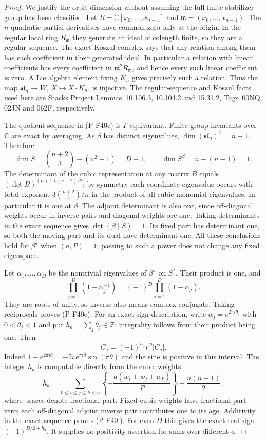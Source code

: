 \begin{proof}
We justify the orbit dimension without assuming the full
finite stabilizer group has been classified. Let
$R=\mathbb C[x_0,\ldots,x_{n-1}]$ and
$\mathfrak m=(x_0,\ldots,x_{n-1})$.
The $n$ quadratic partial derivatives have common zero only
at the origin. In the regular local ring $R_{\mathfrak m}$
they generate an ideal of colength finite, so they are a
regular sequence. The exact Koszul complex says that any
relation among them has each coefficient in their generated
ideal. In particular a relation with linear coefficients
has every coefficient in $\mathfrak m^2R_{\mathfrak m}$,
and hence every such linear coefficient is zero.
A Lie algebra element fixing $K_n$ gives precisely such a
relation. Thus the map
$\mathfrak{sl}_n\to W$, $X\mapsto X\cdot K_n$,
is injective. The regular-sequence and Koszul facts used
here are Stacks Project Lemmas~10.106.3, 10.104.2 and
15.31.2, Tags~00NQ, 02JN and 062F, respectively.

The quotient sequence in (P-F40c) is $\Gamma$-equivariant.
Finite-group invariants over $\mathbb C$ are exact by
averaging. As $\beta$ has distinct eigenvalues,
$\dim(\mathfrak{sl}_n)^\beta=n-1$. Therefore
\[
 \dim S=\binom{n+2}{3}-(n^2-1)=D+1,
 \qquad \dim S^\beta=n-(n-1)=1.
\]
The determinant of the cubic representation at any matrix
$B$ equals $(\det B)^{(n+1)(n+2)/2}$: by symmetry each
coordinate eigenvalue occurs with total exponent
$3\binom{n+2}{3}/n$ in the product of all cubic monomial
eigenvalues. In particular it is one at $\beta$.
The adjoint determinant is also one, since off-diagonal
weights occur in inverse pairs and diagonal weights are one.
Taking determinants in the exact sequence gives
$\det(\beta\mid S)=1$. Its fixed part has determinant one,
so both the moving part and its dual have determinant one.
All these conclusions hold for $\beta^a$ when $(a,P)=1$;
passing to such a power does not change any fixed eigenspace.

Let $\alpha_1,\ldots,\alpha_D$ be the nontrivial eigenvalues
of $\beta^a$ on $S^*$. Their product is one, and
\[
 \prod_{j=1}^D(1-\alpha_j^{-1})
     =(-1)^D\prod_{j=1}^D(1-\alpha_j).
\]
They are roots of unity, so inverse also means complex
conjugate. Taking reciprocals proves (P-F40e).
For an exact sign description, write
$\alpha_j=e^{2\pi i\theta_j}$ with $0<\theta_j<1$ and put
$h_a=\sum_j\theta_j\in\mathbb Z$; integrality follows
from their product being one. Then
\[
 C_a=(-1)^{h_a}i^D |C_a|.
 \tag{P-F40h}
\]
Indeed $1-e^{2\pi i\theta}=-2i\,e^{\pi i\theta}
\sin(\pi\theta)$ and the sine is positive in this interval.
The integer $h_a$ is computable directly from the cubic
weights:
\[
 h_a=\sum_{0\le i\le j\le k<n}
       \left\{-\frac{a(w_i+w_j+w_k)}P\right\}
                   -\frac{n(n-1)}2,
 \tag{P-F40i}
\]
where braces denote fractional part. Fixed cubic weights
have fractional part zero; each off-diagonal adjoint inverse
pair contributes one to its age. Additivity in the exact
sequence proves (P-F40i).
For even $D$ this gives the exact real sign
$(-1)^{D/2+h_a}$. It supplies no positivity assertion for
sums over different $a$.


\end{proof}
